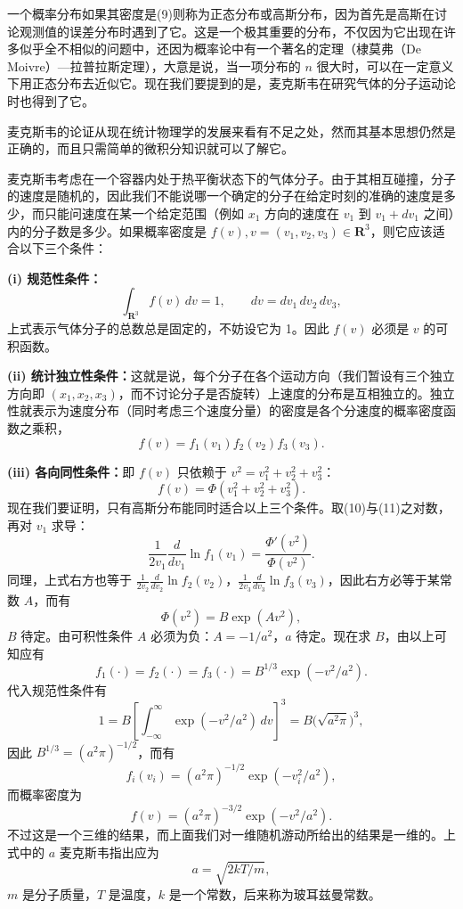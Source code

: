 一个概率分布如果其密度是(9)则称为正态分布或高斯分布，因为首先是高斯在讨论观测值的误差分布时遇到了它。这是一个极其重要的分布，不仅因为它出现在许多似乎全不相似的问题中，还因为概率论中有一个著名的定理（棣莫弗（De Moivre）—拉普拉斯定理），大意是说，当一项分布的 $n$ 很大时，可以在一定意义下用正态分布去近似它。现在我们要提到的是，麦克斯韦在研究气体的分子运动论时也得到了它。

麦克斯韦的论证从现在统计物理学的发展来看有不足之处，然而其基本思想仍然是正确的，而且只需简单的微积分知识就可以了解它。

麦克斯韦考虑在一个容器内处于热平衡状态下的气体分子。由于其相互碰撞，分子的速度是随机的，因此我们不能说哪一个确定的分子在给定时刻的准确的速度是多少，而只能问速度在某一个给定范围（例如 $x_1$ 方向的速度在 $v_1$ 到 $v_1+dv_1$ 之间）内的分子数是多少。如果概率密度是 $f(v),v=(v_1,v_2,v_3)\in\mathbf R^3$，则它应该适合以下三个条件：

\noindent\textbf{(i) 规范性条件：}
\[
 \int_{\mathbf R^3}f(v)\,dv=1,\qquad dv=dv_1\,dv_2\,dv_3,
\]
上式表示气体分子的总数总是固定的，不妨设它为 1。因此 $f(v)$ 必须是 $v$ 的可积函数。

\noindent\textbf{(ii) 统计独立性条件：}这就是说，每个分子在各个运动方向（我们暂设有三个独立方向即 $(x_1,x_2,x_3)$，而不讨论分子是否旋转）上速度的分布是互相独立的。独立性就表示为速度分布（同时考虑三个速度分量）的密度是各个分速度的概率密度函数之乘积，
\begin{equation}
 f(v)=f_1(v_1)f_2(v_2)f_3(v_3).
 \tag{10}
\end{equation}

\noindent\textbf{(iii) 各向同性条件：}即 $f(v)$ 只依赖于 $v^2=v_1^2+v_2^2+v_3^2$：
\begin{equation}
 f(v)=\Phi(v_1^2+v_2^2+v_3^2).
 \tag{11}
\end{equation}
现在我们要证明，只有高斯分布能同时适合以上三个条件。取(10)与(11)之对数，再对 $v_1$ 求导：
\[
 \frac1{2v_1}\frac{d}{dv_1}\ln f_1(v_1)=\frac{\Phi'(v^2)}{\Phi(v^2)}.
\]
同理，上式右方也等于 $\frac1{2v_2}\frac{d}{dv_2}\ln f_2(v_2)$，$\frac1{2v_3}\frac{d}{dv_3}\ln f_3(v_3)$，因此右方必等于某常数 $A$，而有
\[
 \Phi(v^2)=B\exp(Av^2),
\]
$B$ 待定。由可积性条件 $A$ 必须为负：$A=-1/a^2$，$a$ 待定。现在求 $B$，由以上可知应有
\[
 f_1(\cdot)=f_2(\cdot)=f_3(\cdot)=B^{1/3}\exp(-v^2/a^2).
\]
代入规范性条件有
\[
 1=B\left[\int_{-\infty}^{\infty}\exp(-v^2/a^2)\,dv\right]^3
 =B\bigl(\sqrt{a^2\pi}\bigr)^3,
\]
因此 $B^{1/3}=(a^2\pi)^{-1/2}$，而有
\[
 f_i(v_i)=(a^2\pi)^{-1/2}\exp(-v_i^2/a^2),
\]
而概率密度为
\[
 f(v)=(a^2\pi)^{-3/2}\exp(-v^2/a^2).
\]
不过这是一个三维的结果，而上面我们对一维随机游动所给出的结果是一维的。上式中的 $a$ 麦克斯韦指出应为
\[
 a=\sqrt{2kT/m},
\]
$m$ 是分子质量，$T$ 是温度，$k$ 是一个常数，后来称为玻耳兹曼常数。

